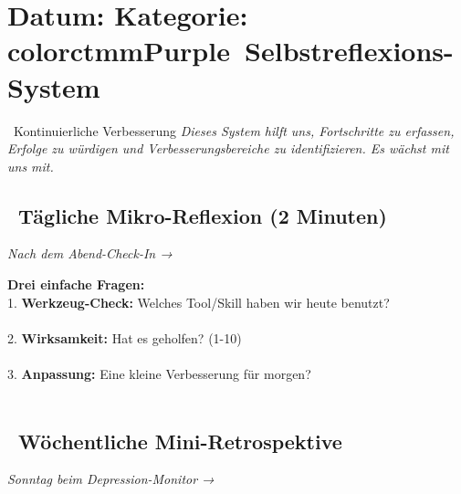 \newpage
\section*{\tex\textbf{Datum:}  \quad \textbf{Kategorie:}   \\[0.3cm]color{ctmmPurple}{\faChartLine~Selbstreflexions-System}}
\label{sec:feedback}

\begin{ctmmPurpleBox}{\faSync~Kontinuierliche Verbesserung}
\textit{Dieses System hilft uns, Fortschritte zu erfassen, Erfolge zu würdigen und Verbesserungsbereiche zu identifizieren. Es wächst mit uns mit.}
\end{ctmmPurpleBox}

\subsection*{\faCalendar~Tägliche Mikro-Reflexion (2 Minuten)}
\textit{Nach dem Abend-Check-In → }

\textbf{Drei einfache Fragen:}\\[0.3cm]
1. \textbf{Werkzeug-Check:} Welches Tool/Skill haben wir heute benutzt?\\
\\[0.3cm]

2. \textbf{Wirksamkeit:} Hat es geholfen? (1-10)\\
\\[0.3cm]

3. \textbf{Anpassung:} Eine kleine Verbesserung für morgen?\\
\\[0.5cm]

\subsection*{\faCalendar~Wöchentliche Mini-Retrospektive}
\textit{Sonntag beim Depression-Monitor → }

